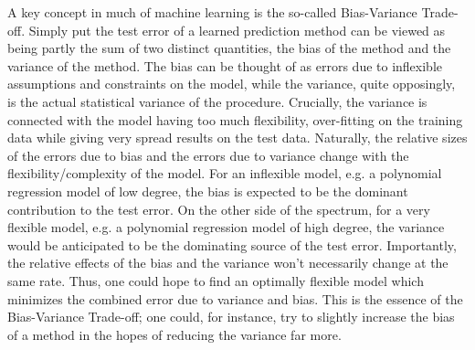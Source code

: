 \documentclass[reprint, english, nofootinbib]{revtex4-2}
\begin{document}
        \noindent
        A key concept in much of machine learning is the so-called Bias-Variance Trade-off. Simply put the test error of a learned prediction method can be viewed as being partly the sum of two distinct quantities, the bias of the method and the variance of the method. The bias can be thought of as errors due to inflexible assumptions and constraints on the model, while the variance, quite opposingly, is the actual statistical variance of the procedure. Crucially, the variance is connected with the model having too much flexibility, over-fitting on the training data while giving very spread results on the test data. Naturally, the relative sizes of the errors due to bias and the errors due to variance change with the flexibility/complexity of the model. For an inflexible model, e.g. a polynomial regression model of low degree, the bias is expected to be the dominant contribution to the test error. On the other side of the spectrum, for a very flexible model, e.g. a polynomial regression model of high degree, the variance would be anticipated to be the dominating source of the test error. Importantly, the relative effects of the bias and the variance won't necessarily change at the same rate. Thus, one could hope to find an optimally flexible model which minimizes the combined error due to variance and bias. This is the essence of the Bias-Variance Trade-off; one could, for instance, try to slightly increase the bias of a method in the hopes of reducing the variance far more.
\end{document}
